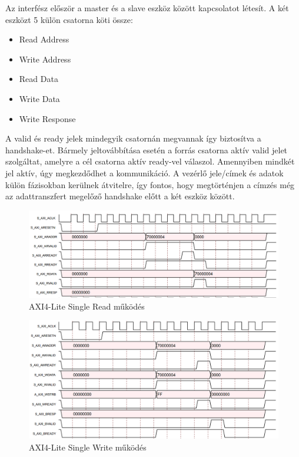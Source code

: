 \documentclass[a4paper,11pt]{article}
\begin{document}
Az interfész először a master és a slave eszköz között kapcsolatot létesít. A két eszközt 5 külön csatorna köti össze:
\begin{itemize}
	\item Read Address
	\item Write Address
	\item Read Data
	\item Write Data
	\item Write Response
\end{itemize}
A valid és ready jelek mindegyik csatornán megvannak így biztosítva a handshake-et. Bármely jeltovábbítása esetén a forrás csatorna aktív valid jelet szolgáltat, amelyre a cél csatorna aktív ready-vel válaszol. Amennyiben mindkét jel aktív, úgy megkezdődhet a kommunikáció. A vezérlő jele/címek és adatok külön fázisokban kerülnek átvitelre, így fontos, hogy megtörténjen a címzés még az adattranszfert megelőző handshake előtt a két eszköz között.
\begin{figure}[H]
	\begin{center}
	\includegraphics[scale=1.6]{axi_single_read.png}
	\caption{AXI4-Lite Single Read működés}
	\label{fig:axi_single_read}
	\end{center}
\end{figure}
\begin{figure}[H]
	\begin{center}
	\includegraphics[scale=1.6]{axi_single_write.png}
	\caption{AXI4-Lite Single Write működés}
	\label{fig:axi_single_write}
	\end{center}
\end{figure}
\end{document}
